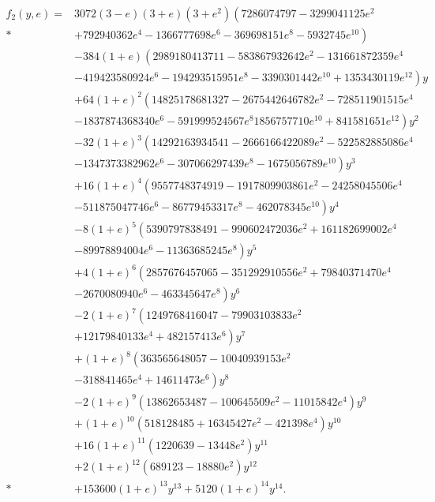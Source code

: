 \begin{align}
f_2(y, e) = {} & 3072 (3 - e) (3 + e) \left(3 + e^2 \right) \left(7286074797 - 3299041125 e^2 \right. \nonumber \\*
 {} & + \left. 792940362 e^4 - 1366777698 e^6 - 369698151 e^8 - 5932745 e^{10} \right) \nonumber \\
 {} & - \left. 384 (1 + e) \left(2989180413711 - 583867932642 e^2 - 131661872359 e^4 \right.\right. \nonumber \\
 {} & - \left. 419423580924 e^6 - 194293515951 e^8 - 3390301442 e^{10} + 1353430119 e^{12} \right) {y} \nonumber \\
 {} & + \left. 64 (1 + e)^2 \left(14825178681327 - 2675442646782 e^2 - 728511901515 e^4 \right.\right. \nonumber \\
 {} & - \left. 1837874368340 e^6 - 591999524567 e^8 1856757710 e^{10} + 841581651 e^{12}\right) y^2 \nonumber \\
 {} & - \left. 32 (1 + e)^3 \left(14292163934541 -2666166422089 e^2 - 522582885086 e^4 \right.\right. \nonumber \\
 {} & - \left. 1347373382962 e^6 - 307066297439 e^8 - 1675056789 e^{10}\right) y^3 \nonumber \\
 {} & + \left. 16 (1 + e)^4 \left(9557748374919 - 1917809903861 e^2 - 24258045506 e^4 \right.\right. \nonumber \\
 {} & - \left. 511875047746 e^6 - 86779453317 e^8 - 462078345 e^{10}\right) y^4 \nonumber \\
 {} & - \left. 8 (1 + e)^5 \left(5390797838491 - 990602472036 e^2 + 161182699002 e^4 \right.\right. \nonumber \\
 {} & - \left. 89978894004 e^6 - 11363685245 e^8\right) y^5 \nonumber \\
 {} & + \left. 4 (1 + e)^6 \left(2857676457065 - 351292910556 e^2 + 79840371470 e^4 \right.\right. \nonumber \\
 {} & - \left. 2670080940 e^6 - 463345647 e^8 \right) y^6 \nonumber \\
 {} & - \left. 2 (1 + e)^7 \left(1249768416047 - 79903103833 e^2 \right.\right. \nonumber \\
 {} & + \left. 12179840133 e^4 + 482157413 e^6\right) y^7 \nonumber \\
 {} & + \left. (1 + e)^8 \left(363565648057 - 10040939153 e^2 \right.\right. \nonumber \\
 {} & - \left. 318841465 e^4 + 14611473 e^6 \right) y^8 \nonumber \\
 {} & - \left. 2 (1 + e)^9 \left(13862653487 - 100645509 e^2 - 11015842 e^4\right) y^9 \right. \nonumber \\
 {} & + \left. (1 + e)^{10} \left(518128485 + 16345427 e^2 - 421398 e^4\right) y^{10} \right. \nonumber \\
 {} & + \left. 16 (1 + e)^{11} \left(1220639 - 13448 e^2 \right) y^{11} \right. \nonumber \\
 {} & + \left. 2 (1 + e)^{12} \left(689123 - 18880 e^2 \right) y^{12} \right. \nonumber \\*
 {} & + \left. 153600 (1 + e)^{13} y^{13} + 5120 (1 + e)^{14} {y}^{14}. \right.
\end{align}
